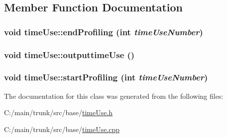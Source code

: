 \subsection{Member Function Documentation}
\hypertarget{classtime_use_aade844e77b4179335dfccda884ee5f04}{
\subsubsection[{endProfiling}]{\setlength{\rightskip}{0pt plus 5cm}void timeUse::endProfiling (int {\em timeUseNumber})}}
\label{classtime_use_aade844e77b4179335dfccda884ee5f04}
\hypertarget{classtime_use_a25cdeb0324880ab8260a6e97d56dd2d8}{
\subsubsection[{outputtimeUse}]{\setlength{\rightskip}{0pt plus 5cm}void timeUse::outputtimeUse ()}}
\label{classtime_use_a25cdeb0324880ab8260a6e97d56dd2d8}
\hypertarget{classtime_use_af0e1376944bfc9ef67c9c9e8569d703a}{
\subsubsection[{startProfiling}]{\setlength{\rightskip}{0pt plus 5cm}void timeUse::startProfiling (int {\em timeUseNumber})}}
\label{classtime_use_af0e1376944bfc9ef67c9c9e8569d703a}


The documentation for this class was generated from the following files:\begin{DoxyCompactItemize}
\item 
C:/main/trunk/src/base/\hyperlink{time_use_8h}{timeUse.h}\item 
C:/main/trunk/src/base/\hyperlink{time_use_8cpp}{timeUse.cpp}\end{DoxyCompactItemize}
